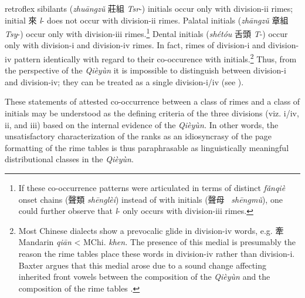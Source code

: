 retroflex sibilants (\emph{zhuāngzǔ} 莊組  \emph{Tsr}-) initials occur
only with division-ii rimes; initial 來 \emph{l}- does not occur with
division-ii rimes. Palatal initials (\emph{zhāngzǔ} 章組 \emph{Tsy}-)
occur only with division-iii rimes.\footnote{If these co-occurrence
  patterns were articulated in terms of distinct  \emph{fǎnqiè} onset
  chains (聲類 \emph{shēnglèi}) instead of with initials
  (聲母~ \emph{shēngmǔ}), one could further observe that \emph{l{}}- only
  occurs with division-iii rimes.} Dental initials (\emph{shétóu} 舌頭
 \emph{T}-) occur only with division-i and division-iv rimes. In fact,
rimes of division-i and division-iv pattern identically with regard to
their co-occurence with initials.\footnote{Most Chinese dialects show a
  prevocalic glide in division-iv words, e.g. 牽 Mandarin \emph{qiān}
  \textless{} MChi. \emph{khen. }The presence of this medial is
  presumably the reason the rime tables place these words in division-iv
  rather than division-i. Baxter argues that this medial arose due to a
  sound change affecting inherited front vowels between the composition
  of the  \emph{Qièyùn} and the composition of the rime tables 
  \citeyearpar[241-243]{Baxter1992}.} Thus, from the perspective of the  \emph{Qièyùn} it is
impossible to distinguish between division-i and division-iv; they can
be treated as a single division-i/iv (see ).

These statements of attested co-occurrence between a class of rimes and
a class of initials may be understood as the defining criteria of the
three divisions (viz. i/iv, ii, and iii) based on the internal evidence
of the \emph{Qièyùn.} In other words, the unsatisfactory
characterization of the ranks as an idiosyncrasy of the page formatting
of the rime tables is thus paraphrasable as linguistically meaningful
dis­tri­bu­tional classes in the  \emph{Qièyùn}.

